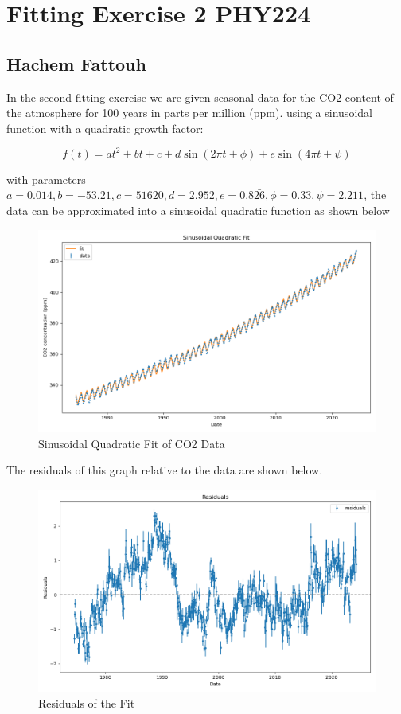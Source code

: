\documentclass{article}
\begin{document}
\section*{Fitting Exercise 2 PHY224}
\subsection*{Hachem Fattouh}

In the second fitting exercise we are given seasonal data for the CO2 content
of the atmosphere for 100 years in parts per million (ppm). using a sinusoidal function with
a quadratic growth factor:

\[f(t) = at^2 + bt + c + d\sin{(2\pi t + \phi)} + e\sin{(4\pi t + \psi)}\]

with parameters \(a = 0.014, b = -53.21, c = 51620, d = 2.952, e = 0.8\bar{26}, \phi = 0.33, \psi = 2.211\),
the data can be approximated into a sinusoidal quadratic function as shown below

\begin{figure}[h]
    \centering
    \includegraphics[width=\textwidth]{fitting_data_and_fit.png}
    \caption{Sinusoidal Quadratic Fit of CO2 Data}
    \label{fig:fit}
\end{figure}
\pagebreak

The residuals of this graph relative to the data are shown below.

\begin{figure}[h]
    \centering
    \includegraphics[width=\textwidth]{fitting_residuals.png}
    \caption{Residuals of the Fit}
    \label{fig:residuals}
\end{figure}
\end{document}
